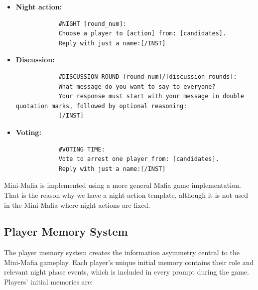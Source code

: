 \documentclass{article}
\begin{document}
\begin{itemize}
    \item\textbf{Night action:}
    
    \begin{small}
        \begin{verbatim}
            #NIGHT [round_num]: 
            Choose a player to [action] from: [candidates].
            Reply with just a name:[/INST]
        \end{verbatim}
    \end{small}

    \item\textbf{Discussion:}

    \begin{small}
        \begin{verbatim}
            #DISCUSSION ROUND [round_num]/[discussion_rounds]: 
            What message do you want to say to everyone?
            Your response must start with your message in double quotation marks, followed by optional reasoning:
            [/INST]
        \end{verbatim}
    \end{small}
    
    \item\textbf{Voting:}
    
    \begin{small}
        \begin{verbatim}
            #VOTING TIME: 
            Vote to arrest one player from: [candidates].
            Reply with just a name:[/INST]
        \end{verbatim}
    \end{small}
\end{itemize}
Mini-Mafia is implemented using a more general Mafia game implementation. That is the reason why we have a night action template, although it is not used in the Mini-Mafia where night actions are fixed.

\subsection{Player Memory System}
\label{appendix:memory}

The player memory system creates the information asymmetry central to the Mini-Mafia gameplay. Each player's unique initial memory contains their role and relevant night phase events, which is included in every prompt during the game. Players' initial memories are:
\end{document}
